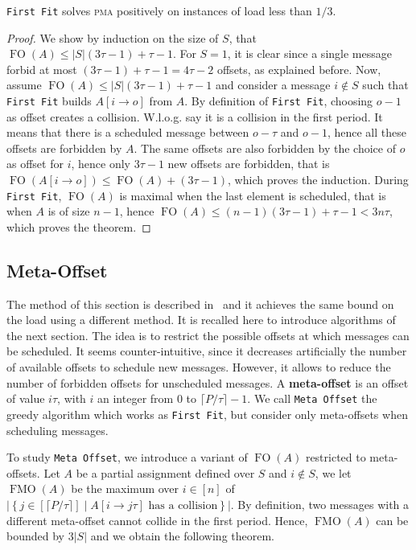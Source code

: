 \documentclass[a4paper,UKenglish,cleveref, autoref, thm-restate]{lipics-v2019}
\DeclareMathOperator{\Fo}{FO}
\DeclareMathOperator{\Fmo}{FMO}
\newcommand\pma{\textsc{pma}\xspace}
\newcommand\firstfit{\texttt{First Fit}\xspace}
\newcommand\metaoffset{\texttt{Meta Offset}\xspace}
\begin{document}
\begin{theorem}
\firstfit solves \pma positively on instances of load less than $1/3$. 
\end{theorem}
\begin{proof}
We show by induction on the size of $S$, that $\Fo(A) \leq |S|(3\tau -1) + \tau - 1$. For $S = 1$, it is clear since a single message forbid at most $(3\tau -1) + \tau -1 = 4\tau-2$ offsets, as explained before. Now, assume $\Fo(A) \leq |S|(3\tau -1) + \tau -1$ and consider a message $i \notin S$ such that \firstfit builds $A[i \rightarrow o]$ from $A$. By definition of \firstfit, choosing $o-1$ as offset creates a collision. W.l.o.g. say it is a collision in the first period. It means that there is a scheduled message between $o - \tau $ and $o-1$, hence all these offsets are forbidden by $A$. The same offsets are also forbidden by the choice of $o$ as offset for $i$, hence only $3\tau -1$ new offsets are forbidden, that is $\Fo(A[i \rightarrow o]) \leq \Fo(A) + (3\tau -1)$, which proves the induction.  
 During \firstfit, $\Fo(A)$ is maximal when the last element is scheduled, that is when $A$ is of size $n-1$, hence $\Fo(A) \leq (n-1)(3\tau -1) + \tau - 1 < 3n\tau$, which proves the theorem.
\end{proof}

\subsection{Meta-Offset}

The method of this section is described in~\cite{dominique2018deterministic} and it achieves the same bound on the load using a different method. It is recalled here to introduce algorithms of the next section.
The idea is to restrict the possible offsets at which messages can be scheduled. It seems counter-intuitive, since it decreases artificially the number of available offsets to schedule new messages. However, it allows to reduce the number of forbidden offsets for unscheduled messages. A \textbf{meta-offset} is an offset of value $i\tau$,
with $i$ an integer from $0$ to $\lceil P / \tau \rceil - 1$. We call \metaoffset the greedy algorithm which works as \firstfit, but consider only meta-offsets when scheduling messages. 

To study \metaoffset, we introduce a variant of $\Fo(A)$ restricted to meta-offsets.
 Let $A$ be a partial assignment defined over $S$ and $i\notin S$, we let $\Fmo(A)$ be the maximum over $i \in [n]$ of $|\left\{ j \in [\lceil P / \tau \rceil] \mid A[i \rightarrow j\tau] \text{ has a collision}\right\}|$.
 By definition, two messages with a different meta-offset cannot collide in the first period. Hence, $\Fmo(A)$ can be bounded by $3|S|$ and we obtain the following theorem.
\end{document}
